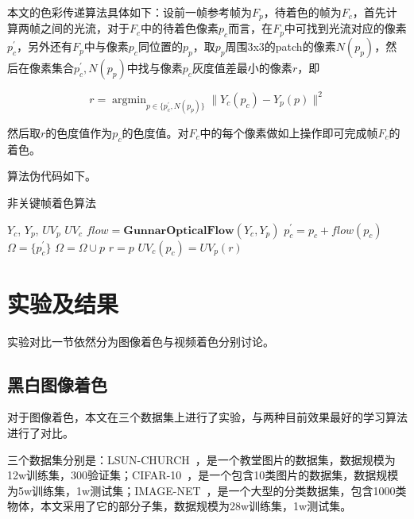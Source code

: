   本文的色彩传递算法具体如下：设前一帧参考帧为$F_p$，待着色的帧为$F_c$，首先计算两帧之间的光流，对于$F_c$中的待着色像素$p_c$而言，在$F_p$中可找到光流对应的像素$p_c^{'}$，另外还有$F_p$中与像素$p_c$同位置的$p_p$，取$p_p$周围3x3的patch的像素$N(p_p)$，然后在像素集合${p_c^{'},N(p_p)}$中找与像素$p_c$灰度值差最小的像素$r$，即

  \begin{equation}
  \label{equ:5-interframe}
    r = \mathop{\arg\min}_{p \in \{p_c^{'},N(p_p)\}} \|Y_c(p_c) - Y_p(p)\|^2
  \end{equation}

  然后取$r$的色度值作为$p_c$的色度值。对$F_c$中的每个像素做如上操作即可完成帧$F_c$的着色。

  算法伪代码如下。

  \begin{algorithm}[H]
  \label{algo:5-interframe}
    \caption*{非关键帧着色算法}
    \begin{algorithmic}[1]
      \Require $Y_c$, $Y_p$, $UV_p$
      \Ensure  $UV_c$
        \State $flow = \textbf{GunnarOpticalFlow}(Y_c, Y_p)$
          \State $p_c^{'} = p_c + flow(p_c)$
          \State $\Omega = \{p_c^{'}\}$
            \State $\Omega = \Omega \cup p$
          \EndFor
              \State $r = p$
            \EndIf
          \EndFor
          \State $UV_c(p_c) = UV_p(r)$
        \EndFor
      \EndFunction
    \end{algorithmic}
  \end{algorithm}

\section{实验及结果}
\label{sec:3-experiment}
  
  实验对比一节依然分为图像着色与视频着色分别讨论。

\subsection{黑白图像着色}
\label{sec:3-image-color-exp}

  对于图像着色，本文在三个数据集上进行了实验，与两种目前效果最好的学习算法进行了对比。

  三个数据集分别是：LSUN-CHURCH~\cite{DBLP:journals/corr/YuZSSX15}，是一个教堂图片的数据集，数据规模为12w训练集，300验证集；CIFAR-10~\cite{CIFAR-10}，是一个包含10类图片的数据集，数据规模为5w训练集，1w测试集；IMAGE-NET~\cite{DBLP:journals/ijcv/RussakovskyDSKS15}，是一个大型的分类数据集，包含1000类物体，本文采用了它的部分子集，数据规模为28w训练集，1w测试集。

